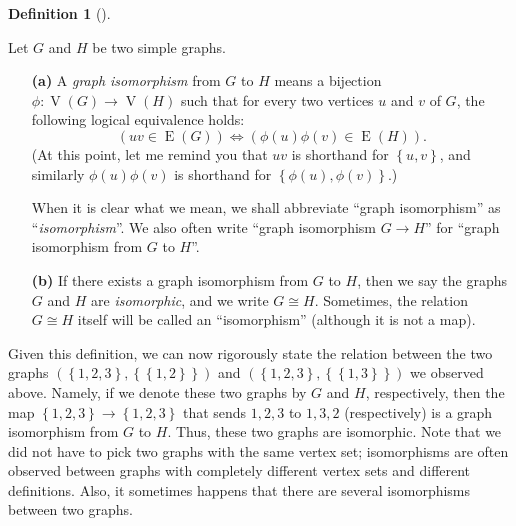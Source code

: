 \documentclass[numbers=enddot,12pt,final,onecolumn,notitlepage]{scrartcl}%
\theoremstyle{definition}
\newtheorem{defi}[theo]{Definition}
\newenvironment{definition}[1][]
{\begin{defi}[#1]\begin{leftbar}}
{\end{leftbar}\end{defi}}
\newcommand{\set}[1]{\left\{ #1 \right\}}
\newcommand{\tup}[1]{\left( #1 \right)}
\newcommand{\verts}[1]{\operatorname{V}\left( #1 \right)}
\newcommand{\edges}[1]{\operatorname{E}\left( #1 \right)}
\begin{document}
\begin{definition} \label{def.intro.iso}
Let $G$ and $H$ be two simple graphs.

\begin{enumerate}

\item[\textbf{(a)}] A \textit{graph isomorphism} from $G$ to $H$ means
a bijection $\phi : \verts{G} \to \verts{H}$ such that for every two
vertices $u$ and $v$ of $G$, the following logical equivalence holds:
\begin{equation}
\left( uv \in \edges{G} \right)
\Longleftrightarrow
\left( \phi\tup{u}\phi\tup{v} \in \edges{H} \right) .
\label{eq.def.intro.iso.a.eq}
\end{equation}
(At this point, let me remind you that $uv$ is shorthand for
$\set{u,v}$, and similarly $\phi\tup{u}\phi\tup{v}$ is shorthand for
$\set{\phi\tup{u},\phi\tup{v}}$.)

When it is clear what we mean, we shall abbreviate
``graph isomorphism'' as ``\textit{isomorphism}''. We also often write
``graph isomorphism $G \to H$'' for ``graph isomorphism from $G$ to
$H$''.

\item[\textbf{(b)}] If there exists a graph isomorphism from $G$ to
$H$, then we say the graphs $G$ and $H$ are \textit{isomorphic}, and
we write $G \cong H$. Sometimes, the relation $G \cong H$ itself will
be called an ``isomorphism'' (although it is not a map).

\end{enumerate}

\end{definition}

Given this definition, we can now rigorously state the relation
between the two graphs $\tup{\set{1,2,3},\set{\set{1,2}}}$ and
$\tup{\set{1,2,3},\set{\set{1,3}}}$ we observed above. Namely, if we
denote these two graphs by $G$ and $H$, respectively, then the map
$\set{1,2,3} \to \set{1,2,3}$ that sends $1,2,3$ to $1,3,2$
(respectively) is a graph isomorphism from $G$ to $H$. Thus, these two
graphs are isomorphic. Note that we did not have to pick two graphs
with the same vertex set; isomorphisms are often observed between
graphs with completely different vertex sets and different
definitions. Also, it sometimes happens that there are several
isomorphisms between two graphs.
\end{document}
